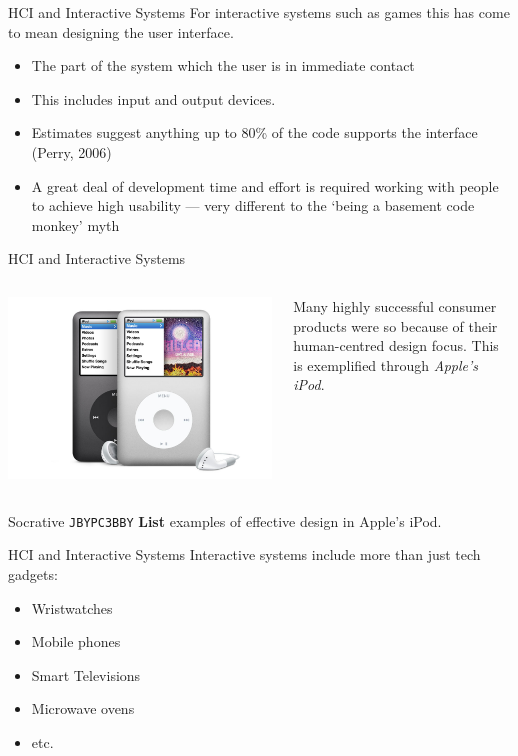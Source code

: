 \begin{frame}{HCI and Interactive Systems}
	For interactive systems such as games this has come to mean designing the user interface. 
	
	\begin{itemize}
		\item The part of the system which the user is in immediate contact
		\item This includes input and output devices.
		\item Estimates suggest anything up to 80\% of the code supports the interface (Perry, 2006)
		\item A great deal of development time and effort is required working with people to achieve high usability --- 
		very different to the `being a basement code monkey' myth
	\end{itemize}
\end{frame}

\begin{frame}{HCI and Interactive Systems}
	\begin{columns}[onlytextwidth]
		\begin{column}{0.45\textwidth}
			\includegraphics[height=14ex]{IPod.jpg}
		\end{column}
		\begin{column}{0.45\textwidth}
			Many highly successful consumer products were so because of their human-centred design focus. This
			is exemplified through \textit{Apple's iPod}.
		\end{column}
	\end{columns}
\end{frame}

\begin{frame}[fragile]{Socrative \texttt{JBYPC3BBY}}
    \textbf{List} examples of effective design in Apple's iPod.
\end{frame}

\begin{frame}{HCI and Interactive Systems}
	Interactive systems include more than just tech gadgets:
	
	\begin{itemize}
		\item Wristwatches
		\item Mobile phones
		\item Smart Televisions
		\item Microwave ovens
		\item etc.
	\end{itemize}
\end{frame}

